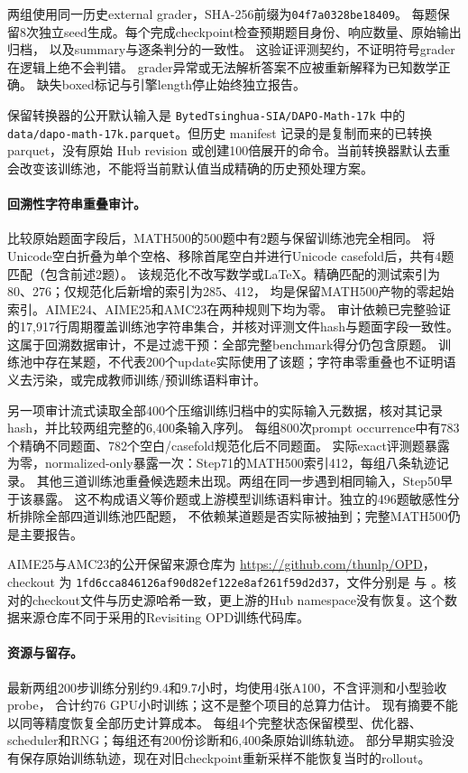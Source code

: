 两组使用同一历史external grader，SHA-256前缀为\texttt{04f7a0328be18409}。
每题保留8次独立seed生成。每个完成checkpoint检查预期题目身份、响应数量、原始输出归档，
以及summary与逐条判分的一致性。
这验证评测契约，不证明符号grader在逻辑上绝不会判错。
grader异常或无法解析答案不应被重新解释为已知数学正确。
缺失boxed标记与引擎length停止始终独立报告。

保留转换器的公开默认输入是 \texttt{BytedTsinghua-SIA/DAPO-Math-17k} 中的 \texttt{data/dapo-math-17k.parquet}。但历史 manifest 记录的是复制而来的已转换 parquet，没有原始 Hub revision 或创建100倍展开的命令。当前转换器默认去重会改变该训练池，不能将当前默认值当成精确的历史预处理方案。

\paragraph{回溯性字符串重叠审计。}
比较原始题面字段后，MATH500的500题中有2题与保留训练池完全相同。
将Unicode空白折叠为单个空格、移除首尾空白并进行Unicode casefold后，共有4题匹配（包含前述2题）。
该规范化不改写数学或LaTeX。精确匹配的测试索引为80、276；仅规范化后新增的索引为285、412，
均是保留MATH500产物的零起始索引。AIME24、AIME25和AMC23在两种规则下均为零。
审计依赖已完整验证的17,917行周期覆盖训练池字符串集合，并核对评测文件hash与题面字段一致性。
这属于回溯数据审计，不是过滤干预：全部完整benchmark得分仍包含原题。
训练池中存在某题，不代表200个update实际使用了该题；字符串零重叠也不证明语义去污染，或完成教师训练/预训练语料审计。

另一项审计流式读取全部400个压缩训练归档中的实际输入元数据，核对其记录hash，并比较两组完整的6,400条输入序列。
每组800次prompt occurrence中有783个精确不同题面、782个空白/casefold规范化后不同题面。
实际exact评测题暴露为零，normalized-only暴露一次：Step71的MATH500索引412，每组八条轨迹记录。
其他三道训练池重叠候选题未出现。两组在同一步遇到相同输入，Step50早于该暴露。
这不构成语义等价题或上游模型训练语料审计。独立的496题敏感性分析排除全部四道训练池匹配题，
不依赖某道题是否实际被抽到；完整MATH500仍是主要报告。

AIME25与AMC23的公开保留来源仓库为 \url{https://github.com/thunlp/OPD}，checkout 为 \texttt{1fd6cca846126af90d82ef122e8af261f59d2d37}，文件分别是  与 。核对的checkout文件与历史源哈希一致，更上游的Hub namespace没有恢复。这个数据来源仓库不同于采用的Revisiting OPD训练代码库。

\paragraph{资源与留存。}
最新两组200步训练分别约9.4和9.7小时，均使用4张A100，不含评测和小型验收probe，
合计约76 GPU小时训练；这不是整个项目的总算力估计。
现有摘要不能以同等精度恢复全部历史计算成本。
每组4个完整状态保留模型、优化器、scheduler和RNG；每组还有200份诊断和6,400条原始训练轨迹。
部分早期实验没有保存原始训练轨迹，现在对旧checkpoint重新采样不能恢复当时的rollout。

